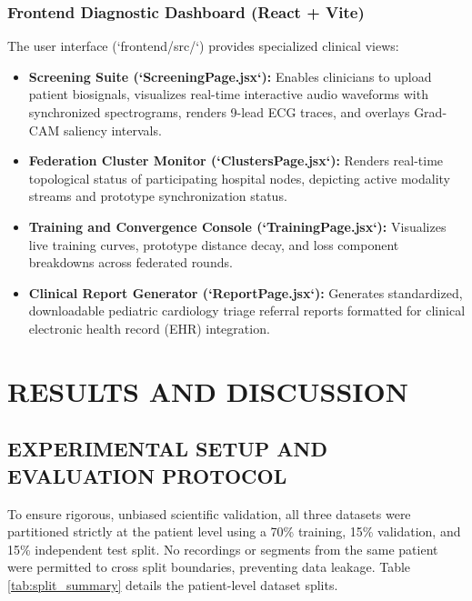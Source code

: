 \documentclass[12pt,a4paper]{amritareport}
\begin{document}
\subsection{Frontend Diagnostic Dashboard (React + Vite)}
The user interface (`frontend/src/`) provides specialized clinical views:
\begin{itemize}
	\item \textbf{Screening Suite (`ScreeningPage.jsx`):} Enables clinicians to upload patient biosignals, visualizes real-time interactive audio waveforms with synchronized spectrograms, renders 9-lead ECG traces, and overlays Grad-CAM saliency intervals.
	\item \textbf{Federation Cluster Monitor (`ClustersPage.jsx`):} Renders real-time topological status of participating hospital nodes, depicting active modality streams and prototype synchronization status.
	\item \textbf{Training and Convergence Console (`TrainingPage.jsx`):} Visualizes live training curves, prototype distance decay, and loss component breakdowns across federated rounds.
	\item \textbf{Clinical Report Generator (`ReportPage.jsx`):} Generates standardized, downloadable pediatric cardiology triage referral reports formatted for clinical electronic health record (EHR) integration.
\end{itemize}



\chapter{RESULTS AND DISCUSSION}

\section{EXPERIMENTAL SETUP AND EVALUATION PROTOCOL}

To ensure rigorous, unbiased scientific validation, all three datasets were partitioned strictly at the patient level using a 70\% training, 15\% validation, and 15\% independent test split. No recordings or segments from the same patient were permitted to cross split boundaries, preventing data leakage. Table \ref{tab:split_summary} details the patient-level dataset splits.
\end{document}
